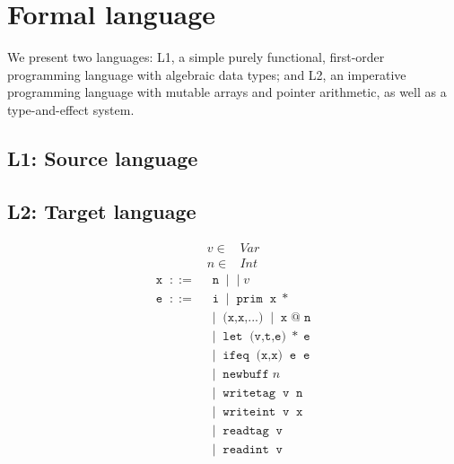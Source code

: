 \documentclass[preprint,10pt]{./bibs/sigplanconf}
\newcommand{\gramdef}{\; ::= \;}
\newcommand{\gramor}{\; | \;}
\newcommand{\keywd}[1]{\; \texttt{#1} \;}
\begin{document}
\section{Formal language}


We present two languages: L1, a simple purely functional, first-order programming
language with algebraic data types; and L2, an imperative programming language
with mutable arrays and pointer arithmetic, as well as a type-and-effect system.

\subsection{L1: Source language}

\subsection{L2: Target language}

\begin{displaymath}
  \begin{aligned}
    v \in & Var \\
    n \in & Int
  \end{aligned}
\end{displaymath}
\begin{displaymath}
  \begin{aligned}
    \keywd{x} \gramdef & \keywd{n} \gramor \gramor{v} \\
    \keywd{e} \gramdef & \keywd{i} \gramor \keywd{prim} \keywd{x}* \\
    & \gramor \keywd{(x,x,...)} \gramor \keywd{x} @ \keywd{n} \\
    & \gramor \keywd{let} \keywd{(v,t,e)}* \keywd{e} \\
    & \gramor \keywd{ifeq} \keywd{(x,x)} \keywd{e} \keywd{e} \\
    & \gramor \keywd{newbuff} n \\
    & \gramor \keywd{writetag} \keywd{v} \keywd{n} \\
    & \gramor \keywd{writeint} \keywd{v} \keywd{x} \\
    & \gramor \keywd{readtag} \keywd{v} \\
    & \gramor \keywd{readint} \keywd{v}
  \end{aligned}
\end{displaymath}
\end{document}
